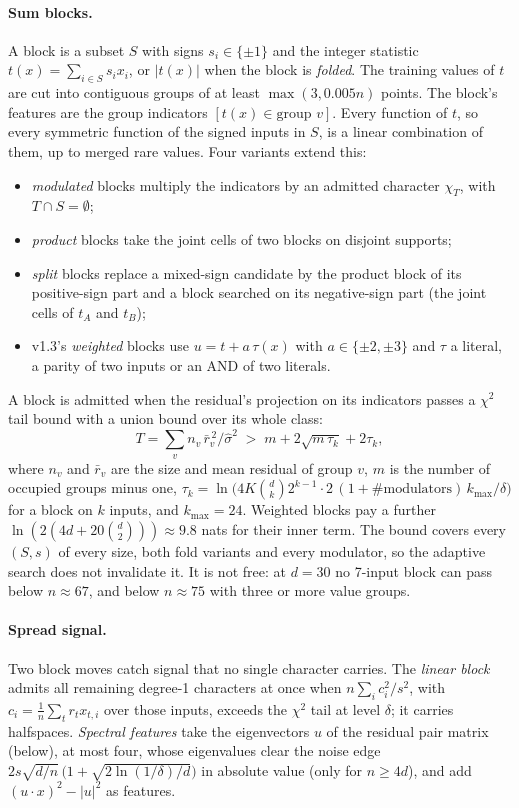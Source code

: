 \paragraph{Sum blocks.} A block is a subset $S$ with signs $s_i\in\{\pm1\}$ and the integer statistic $t(x)=\sum_{i\in S}s_ix_i$, or $|t(x)|$ when the block is \emph{folded}. The training values of $t$ are cut into contiguous groups of at least $\max(3,0.005n)$ points. The block's features are the group indicators $[t(x)\in\text{group }v]$. Every function of $t$, so every symmetric function of the signed inputs in $S$, is a linear combination of them, up to merged rare values. Four variants extend this:
\begin{itemize}
\item \emph{modulated} blocks multiply the indicators by an admitted character $\chi_T$, with $T\cap S=\emptyset$;
\item \emph{product} blocks take the joint cells of two blocks on disjoint supports;
\item \emph{split} blocks replace a mixed-sign candidate by the product block of its positive-sign part and a block searched on its negative-sign part (the joint cells of $t_A$ and $t_B$);
\item v1.3's \emph{weighted} blocks use $u=t+a\,\tau(x)$ with $a\in\{\pm2,\pm3\}$ and $\tau$ a literal, a parity of two inputs or an AND of two literals.
\end{itemize}
A block is admitted when the residual's projection on its indicators passes a $\chi^2$ tail bound \cite{laurent2000adaptive} with a union bound over its whole class:
\begin{equation}\label{eq:blocktest}
T=\textstyle\sum_v n_v\,\bar r_v^{\,2}/\hat\sigma^2\;>\;m+2\sqrt{m\,\tau_k}+2\tau_k ,
\end{equation}
where $n_v$ and $\bar r_v$ are the size and mean residual of group $v$, $m$ is the number of occupied groups minus one, $\tau_k=\ln\bigl(4K\binom dk2^{k-1}\cdot2\,(1+\#\text{modulators})\,k_{\max}/\delta\bigr)$ for a block on $k$ inputs, and $k_{\max}=24$. Weighted blocks pay a further $\ln(2(4d+20\binom d2))\approx9.8$ nats for their inner term. The bound covers every $(S,s)$ of every size, both fold variants and every modulator, so the adaptive search does not invalidate it. It is not free: at $d=30$ no 7-input block can pass below $n\approx67$, and below $n\approx75$ with three or more value groups.

\paragraph{Spread signal.} Two block moves catch signal that no single character carries. The \emph{linear block} admits all remaining degree-1 characters at once when $n\sum_i c_i^2/s^2$, with $c_i=\frac1n\sum_tr_tx_{t,i}$ over those inputs, exceeds the $\chi^2$ tail at level $\delta$; it carries halfspaces. \emph{Spectral features} take the eigenvectors $u$ of the residual pair matrix (below), at most four, whose eigenvalues clear the noise edge $2s\sqrt{d/n}\,\bigl(1+\sqrt{2\ln(1/\delta)/d}\bigr)$ in absolute value (only for $n\ge4d$), and add $(u\cdot x)^2-|u|^2$ as features.


